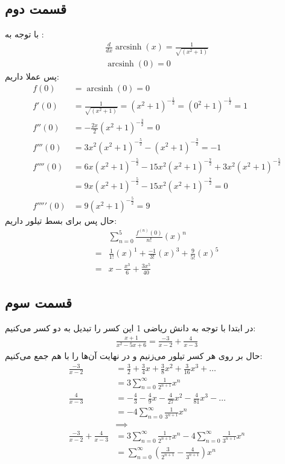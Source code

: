 \documentclass[]{article}
\begin{document}
\subsection*{قسمت دوم}
با توجه به :
\begin{gather*}
    \frac{d}{dx}\operatorname{arcsinh}(x) = \frac{1}{\sqrt{(x^2+1)}}\\
    \operatorname{arcsinh}(0) = 0
\end{gather*}
پس عملا داریم:
\begin{align*}
    f(0) &= \operatorname{arcsinh}(0) = 0\\
    f'(0) &= \frac{1}{\sqrt{(x^2+1)}} = (x^2+1)^{-\frac{1}{2}} = (0^2+1)^{-\frac{1}{2}} = 1\\
    f''(0) &= -\frac{2x}{2} (x^2+1)^{-\frac{3}{2}} = 0\\
    f'''(0) &= 3x^2 (x^2+1)^{-\frac{5}{2}} - (x^2+1)^{-\frac{3}{2}} = -1\\
    f''''(0) &= 6x (x^2+1)^{-\frac{5}{2}} - 15x^2 (x^2+1)^{-\frac{7}{2}} + 3x^2 (x^2+1)^{-\frac{5}{2}} \\
    &= 9x (x^2+1)^{-\frac{5}{2}} - 15x^2 (x^2+1)^{-\frac{7}{2}} = 0\\
    f'''''(0) &= 9 (x^2+1)^{-\frac{5}{2}} = 9
\end{align*}
حال پس برای بسط تیلور داریم:
\begin{align*}
    &\sum_{n=0}^{5} \frac{f^{(n)}(0)}{n!}(x)^n\\
    =&\frac{1}{1!}(x)^1 + \frac{-1}{3!}(x)^3 + \frac{9}{5!}(x)^5\\
    =&\boxed{x - \frac{x^3}{6} + \frac{3x^5}{40}}
\end{align*}
\subsection*{قسمت سوم}
در ابتدا با توجه به دانش ریاضی 1 این کسر را تبدیل به دو کسر می‌کنیم:
\begin{gather*}
    \frac{x+1}{x^2-5x+6} = \frac{-3}{x-2} + \frac{4}{x-3}
\end{gather*}
حال بر روی هر کسر تیلور می‌زنیم و در نهایت آن‌ها را با هم جمع می‌کنیم:
\begin{align*}
    \frac{-3}{x-2} &= \frac{3}{2}+\frac{3}{4} x +\frac{3}{8} x^{2}+\frac{3}{16} x^{3}+\dots\\
    &= 3 \sum_{n=0}^{\infty} \frac{1}{2^{n+1}}x^n\\
    \frac{4}{x-3} &= -\frac{4}{3}-\frac{4}{9} x -\frac{4}{27} x^{2}-\frac{4}{81} x^{3}-\dots\\
    &= -4 \sum_{n=0}^{\infty} \frac{1}{3^{n+1}}x^n\\
    &\implies\\
    \frac{-3}{x-2} + \frac{4}{x-3} &= 3 \sum_{n=0}^{\infty} \frac{1}{2^{n+1}}x^n -4 \sum_{n=0}^{\infty} \frac{1}{3^{n+1}}x^n\\
    &= \boxed{\sum_{n=0}^{\infty} (\frac{3}{2^{n+1}} - \frac{4}{3^{n+1}})x^n}
\end{align*}
\end{document}
